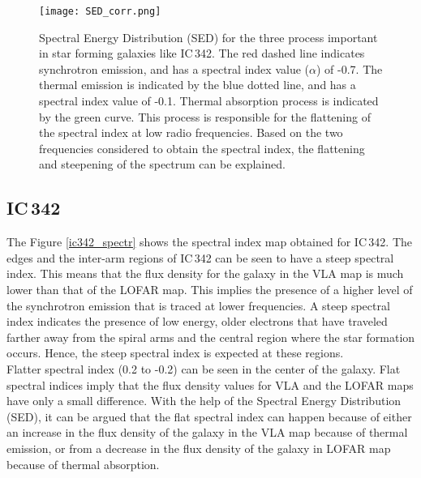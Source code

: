 \documentclass[../main/thesis_msc.tex]{subfiles}
\begin{document}
\begin{figure}
\centering
\texttt{[image: SED\_corr.png]}
\caption{Spectral Energy Distribution (SED) for the three process important in star forming galaxies like IC\,342. The red dashed line indicates synchrotron emission, and has a spectral index value ($\alpha$) of -0.7. The thermal emission is indicated by the blue dotted line, and has a spectral index value of -0.1. Thermal absorption process is indicated by the green curve. This process is responsible for the flattening of the spectral index at low radio frequencies. Based on the two frequencies considered to obtain the spectral index, the flattening and steepening of the spectrum can be explained.}
\label{therm}
\end{figure}

\subsection{IC\,342}
The Figure \ref{ic342_spectr} shows the spectral index map obtained for IC\,342. The edges and the inter-arm regions of IC\,342 can be seen to have a steep spectral index. This means that the flux density for the galaxy in the VLA map is much lower than that of the LOFAR map. This implies the presence of a higher level of the synchrotron emission that is traced at lower frequencies. A steep spectral index indicates the presence of low energy, older electrons that have traveled farther away from the spiral arms and the central region where the star formation occurs. Hence, the steep spectral index is expected at these regions.\\


Flatter spectral index (0.2 to -0.2) can be seen in the center of the galaxy. Flat spectral indices imply that the flux density values for VLA and the LOFAR maps have only a small difference. With the help of the Spectral Energy Distribution (SED), it can be argued that the flat spectral index can happen because of either an increase in the flux density of the galaxy in the VLA map because of thermal emission, or from a decrease in the flux density of the galaxy in LOFAR map because of thermal absorption. 
\end{document}

